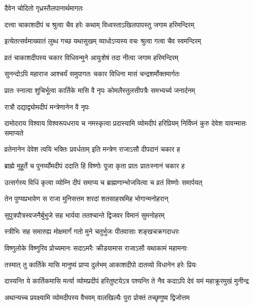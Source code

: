 \onelineshloka
{दैवेन चोदितो गृध्रस्तैलपानार्थमागतः} %

\twolineshloka
{दत्त्वा चाकाशदीपं च श्रुत्वा चैव हरेः कथाम्}
{विध्वस्ताऽखिलपापस्तु जगाम हरिमन्दिरम्} %

\twolineshloka
{इत्येतत्सर्वमाख्यातं लुब्ध गच्छ यथासुखम्}
{व्याधोऽप्यस्य वचः श्रुत्वा गत्वा चैव स्वमन्दिरम्} %

\twolineshloka
{व्रतं चाकाशदीपस्य चकार विधिवन्मुने}
{आयुःशेषं तदा नीत्वा जगाम हरिमन्दिरम्} %

\twolineshloka
{सुनन्दोऽपि महाराज आश्चर्यं समुपागतः}
{चकार विधिना मासं चन्द्रशर्मोक्तमार्गतः} %

\twolineshloka
{प्रातः स्नात्वा शुचिर्भूत्वा कार्तिके मासि वै नृपः}
{कोमलैस्तुलसीपत्रैः समभ्यर्च्य जनार्दनम्} %


\onelineshloka
{रात्रौ दद्याद्व्योमदीपं मन्त्रेणानेन वै नृपः} %

\threelineshloka
{दामोदराय विश्वाय विश्वरूपधराय च}
{नमस्कृत्वा प्रदास्यामि व्योमदीपं हरिप्रियम्}
{निर्विघ्नं कुरु देवेश यावन्मासः समाप्यते} %

\twolineshloka
{व्रतेनानेन देवेश त्वयि भक्तिः प्रवर्धताम्}
{इति मन्त्रेण राजाऽसौ दीपदानं चकार ह} %

\twolineshloka
{ब्राह्मे मुहूर्ते च पुनर्व्योमदीपं ददाति हि}
{विष्णोः पूजा कृता प्रातः प्रातःस्नानं चकार ह} %

\twolineshloka
{उत्सर्गस्य विधिं कृत्वा व्योम्नि दीपं समाप्य च}
{ब्राह्मणान्भोजयित्वा च व्रतं विष्णोः समार्पयत्} %

\twolineshloka
{तेन पुण्यप्रभावेण स राजा मुनिसत्तम}
{शरदां शतसाहस्रमिह भोगान्मनोहरान्} %

\twolineshloka
{सुपुत्रपौत्रस्वजनैर्बुभुजे सह भार्यया}
{ततश्चान्ते द्विजवर विमानं सुमनोहरम्} %

\twolineshloka
{स्त्रीभिः सह समारुह्य मोक्षमार्गं गतो मुने}
{चतुर्भुजः पीतवासाः शङ्खचक्रगदाधरः} %

\twolineshloka
{विष्णुलोके विष्णुरिव प्रोच्यमानः सदाऽमरैः}
{क्रीडयामास राजाऽसौ यथाकामं महामनाः} %

\twolineshloka
{तस्मात् तु कार्तिके मासि मानुष्यं प्राप्य दुर्लभम्}
{आकाशदीपो दातव्यो विधानेन हरेः प्रियः} %

\fourlineindentedshloka
{दास्यन्ति ये कार्तिकमासि मर्त्या}
{व्योमप्रदीपं हरितुष्टयेऽत्र}
{पश्यन्ति ते नैव कदाऽपि देवं}
{यमं महाक्रूरमुखं मुनीन्द्र} %

\twolineshloka
{अथान्यच्च प्रवक्ष्यामि व्योमदीपस्य वैभवम्}
{वालखिल्यैः पुरा प्रोक्तं तच्छृणुष्व द्विजोत्तम} %


